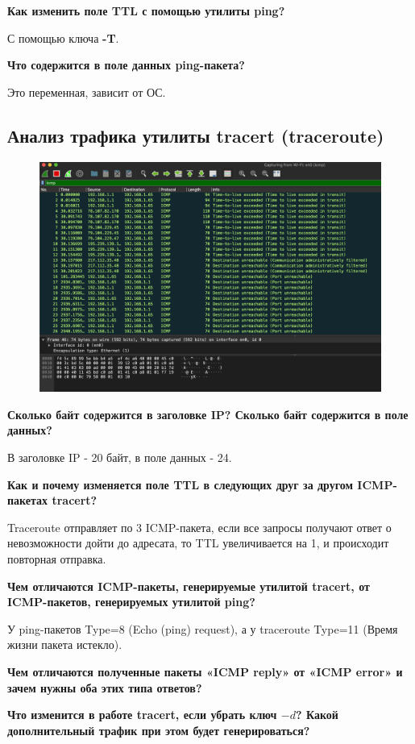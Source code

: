 \textbf{Как изменить поле TTL с помощью утилиты ping?}

С помощью ключа \textbf{-T}.

\textbf{Что содержится в поле данных ping-пакета?}

Это переменная, зависит от ОС.


\subsection{Анализ трафика утилиты tracert (traceroute)}

\begin{figure}[H]
	\centering
	\includegraphics[width=0.7\linewidth]{"../Анализ трафика компьютерных сетей утилитой Wireshark/img/tracert-1"}
	\caption{}
	\label{fig:tracert-1}
\end{figure}


\textbf{Сколько байт содержится в заголовке IP? Сколько байт содержится в поле данных?}

В заголовке IP - 20 байт, в поле данных - 24.

\textbf{Как и почему изменяется поле TTL в следующих друг за другом
ICMP-пакетах tracert?}

Traceroute  отправляет по 3 ICMP-пакета, если  все запросы получают  ответ о невозможности дойти до адресата, то TTL увеличивается на 1, и происходит повторная отправка.

\textbf{Чем отличаются ICMP-пакеты, генерируемые утилитой tracert, от
ICMP-пакетов, генерируемых утилитой ping?}

У ping-пакетов Type=8 (Echo (ping) request),  а у traceroute Type=11 (Время жизни пакета истекло).

\textbf{Чем отличаются полученные пакеты «ICMP reply» от «ICMP error» и
зачем нужны оба этих типа ответов?}

\textbf{Что изменится в работе tracert, если убрать ключ $-d$? Какой
дополнительный трафик при этом будет генерироваться?}

